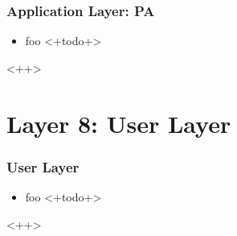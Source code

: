\documentclass{beamer}
\begin{document}
\begin{frame}
  \frametitle{Application Layer: PA}
  \begin{itemize}
    \item foo <+todo+>
  \end{itemize}<++>
\end{frame}

\section{Layer 8: User Layer}
\begin{frame}
  \frametitle{User Layer}
  \begin{itemize}
    \item foo <+todo+>
  \end{itemize}<++>
\end{frame}
\end{document}
